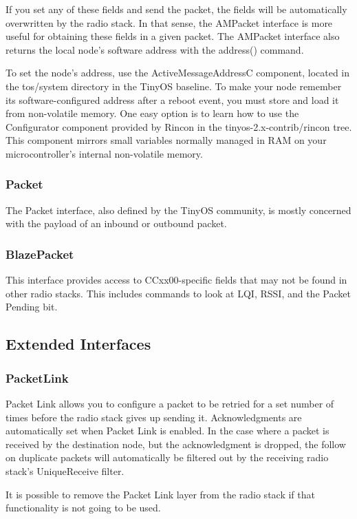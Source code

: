 \documentclass{article}
\begin{document}
If you set any of these fields and send the packet, the fields will be automatically
overwritten by the radio stack. In that sense, the AMPacket interface is more useful for
obtaining these fields in a given packet.  The AMPacket interface also returns the local node's
software address with the address() command. 

To set the node's address, use the ActiveMessageAddressC component, located in the tos/system directory in the 
TinyOS baseline. To make your node remember its software-configured address after a reboot 
event, you must store and load it from non-volatile memory. One easy option is to learn how to use the 
Configurator component provided by Rincon in the tinyos-2.x-contrib/rincon tree. This 
component mirrors small variables normally managed in RAM on your microcontroller's 
internal non-volatile memory. 

\subsubsection{Packet}
The Packet interface, also defined by the TinyOS community,
is mostly concerned with the payload of an inbound or outbound packet.

\subsubsection{BlazePacket}
This interface provides access to CCxx00-specific fields that may not be found in other
radio stacks.  This includes commands to look at LQI, RSSI, and the Packet Pending bit.

\subsection{Extended Interfaces}
\label{sec:extendedinterfaces}

\subsubsection{PacketLink}
Packet Link allows you to configure a packet to be retried for a set number of times before
the radio stack gives up sending it. Acknowledgments are automatically set when Packet Link
is enabled. In the case where a packet is received by the destination node, but the acknowledgment
is dropped, the follow on duplicate packets will automatically be filtered out by the receiving 
radio stack's UniqueReceive filter.

It is possible to remove the Packet Link layer from the radio stack if that functionality
is not going to be used.
\end{document}
